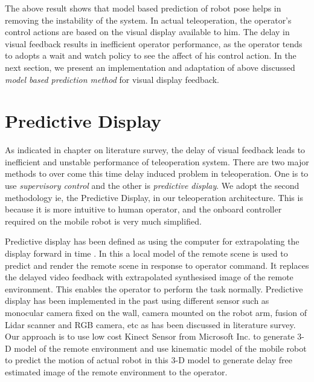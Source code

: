 The above result shows that model based prediction of robot pose helps in removing the instability of the system. In  actual teleoperation, the operator's control actions are based on the visual display available to him.  The delay in visual feedback results in inefficient operator performance, as the operator tends to adopts a wait and watch policy to see the affect of his control action. In the next section, we present  an implementation and adaptation  of above discussed \textit{model based prediction method}  for  visual display feedback.   
  
\section{Predictive Display}
As indicated in chapter on literature survey,  the delay of visual feedback leads to inefficient and unstable performance of teleoperation system. There are two major methods to over come this time delay induced problem in teleoperation. One is to use \textit{supervisory control} and the other is \textit{predictive display}. We adopt the second methodology ie, the Predictive Display, in our teleoperation architecture. This is because it is more intuitive to human operator, and the onboard controller  required on the mobile robot is very much simplified.  

  
Predictive display has been defined as using the computer for extrapolating the display forward in time \cite{sheridan}. In this a local model of the remote scene is used to predict and render the remote scene in response to operator command. It replaces the delayed video feedback with extrapolated synthesised  image of the remote environment. This enables the operator to perform the task normally. Predictive display has been implemented in the past using different sensor such as monocular camera fixed on the wall, camera mounted on the robot arm, fusion of Lidar scanner and RGB camera, etc as has been discussed in literature survey. 
Our approach is to use low cost  Kinect Sensor from Microsoft Inc. to generate 3-D model of the remote environment and use kinematic model of the mobile robot to predict the motion of actual robot in this 3-D model to generate delay free estimated image of the remote environment to the operator.

